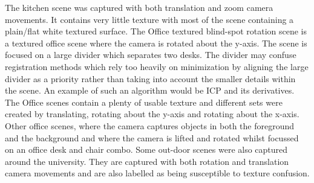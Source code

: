 The kitchen scene was captured with both translation and zoom camera movements. It contains very little texture with most of the scene containing a plain/flat white textured surface. The Office textured blind-spot rotation scene is a textured office scene where the camera is rotated about the y-axis. The scene is focused on a large divider which separates two desks. The divider may confuse registration methods which rely too heavily on minimization by aligning the large divider as a priority rather than taking into account the smaller details within the scene. An example of such an algorithm would be ICP and its derivatives. \\

The Office scenes contain a plenty of usable texture and different sets were created by translating, rotating about the y-axis and rotating about the x-axis. Other office scenes, where the camera captures objects in both the foreground and the background and where the camera is lifted and rotated whilst focussed on an office desk and chair combo. Some out-door scenes were also captured around the university. They are captured with both rotation and translation camera movements and are also labelled as being susceptible to texture confusion. \\